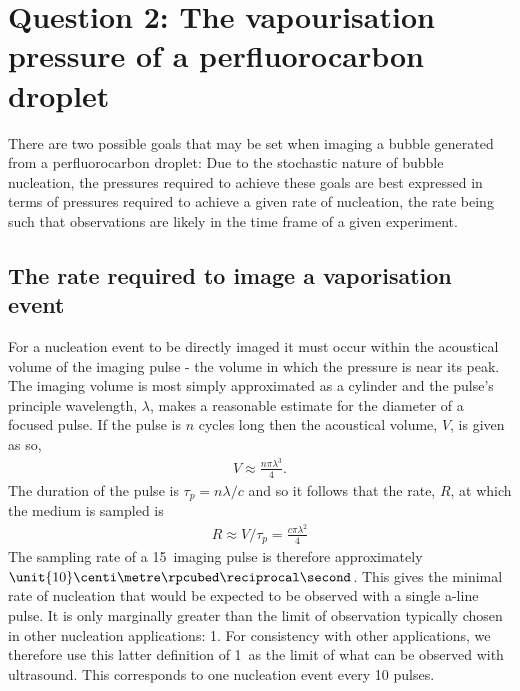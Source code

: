 \section{Question 2: The vapourisation pressure of a perfluorocarbon droplet}\label{sec:nuc:vapourise}

There are two possible goals that may be set 
when imaging a bubble generated from a perfluorocarbon droplet:
Due to the stochastic nature of bubble nucleation, 
the pressures required to achieve these goals are best expressed in terms of pressures required
to achieve a given rate of nucleation,
the rate being such that observations are likely in the time frame of a given experiment.




\subsection{The rate required to image a vaporisation event}

For a nucleation event to be directly imaged
it must occur within the acoustical volume of the imaging pulse -
the volume in which the pressure is near its peak.
%
The imaging volume is most simply approximated as a cylinder
and the pulse's principle wavelength, $\lambda$, makes a reasonable estimate for the diameter of a focused pulse.
If the pulse is $n$ cycles long then the acoustical volume, $V$, is given as so,
\begin{align}
  V \approx \frac{n  \pi \lambda^3 }{ 4}.
\end{align}
The duration of the pulse is $\tau_p=n\lambda/c$ and so it follows that the rate, $R$, at which the medium is sampled is 
\begin{align}
R \approx V/\tau_p = \frac{c\pi\lambda^2 }{4}
\label{eqn:nuc:rateOne}
\end{align}
The sampling rate of a \unit{15}\mega\hertz\ imaging pulse is therefore approximately
$\unit{10}\centi\metre\rpcubed\reciprocal\second$.
This gives the minimal rate of nucleation that would  be expected to be observed with a single a-line pulse.
It is only marginally greater than the limit of observation typically chosen in other nucleation applications: \unit{1}\centi\metre \rpcubed\reciprocal\second \cite{HongChul2005}.
For consistency with other applications, we therefore use this latter definition of  \unit{1}\centi\metre \rpcubed\reciprocal\second\
as the limit of what can be observed with ultrasound.
This corresponds to one nucleation event every 10 pulses.



